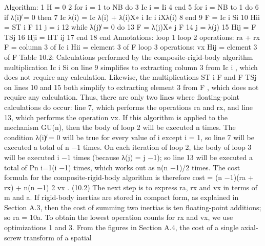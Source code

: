 Algorithm: 1 H = 0 2 for i = 1 to NB do 3 Ic i = Ii 4 end 5 for i = NB to 1 do 6 if λ(i)̸ = 0 then 7 Ic λ(i) = Ic λ(i) + λ(i)X∗ i Ic i iXλ(i) 8 end 9 F = Ic i Si 10 Hii = ST i F 11 j = i 12 while λ(j)̸ = 0 do 13 F = λ(j)X∗ j F 14 j = λ(j) 15 Hij = F TSj 16 Hji = HT ij 17 end 18 end Annotations: loop 1 loop 2 operations: ra + rx F = column 3 of Ic i Hii = element 3 of F loop 3 operations: vx Hij = element 3 of F Table 10.2: Calculations performed by the composite-rigid-body algorithm multiplication Ic i Si on line 9 simplifies to extracting column 3 from Ic i , which does not require any calculation. Likewise, the multiplications ST i F and F TSj on lines 10 and 15 both simplify to extracting element 3 from F , which does not require any calculation. Thus, there are only two lines where floating-point calculations do occur: line 7, which performs the operations ra and rx, and line 13, which performs the operation vx. If this algorithm is applied to the mechanism GU(n), then the body of loop 2 will be executed n times. The condition λ(i)̸ = 0 will be true for every value of i except i = 1, so line 7 will be executed a total of n −1 times. On each iteration of loop 2, the body of loop 3 will be executed i −1 times (because λ(j) = j −1); so line 13 will be executed a total of Pn i=1(i −1) times, which works out as n(n −1)/2 times. The cost formula for the composite-rigid-body algorithm is therefore cost = (n −1)(ra + rx) + n(n −1) 2 vx . (10.2) The next step is to express ra, rx and vx in terms of m and a. If rigid-body inertias are stored in compact form, as explained in Section A.3, then the cost of summing two inertias is ten floating-point additions; so ra = 10a. To obtain the lowest operation counts for rx and vx, we use optimizations 1 and 3. From the figures in Section A.4, the cost of a single axial-screw transform of a spatial

